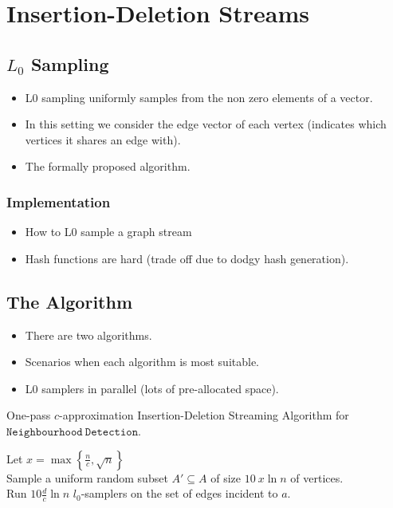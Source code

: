 \documentclass[11pt,twoside,a4paper]{report}
\begin{document}
\chapter{Insertion-Deletion Streams}

\section{$L_0$ Sampling}

\begin{itemize}
	\item L0 sampling uniformly samples from the non zero elements of a vector.
	\item In this setting we consider the edge vector of each vertex (indicates which vertices it shares an edge with).
	\item The formally proposed algorithm.
\end{itemize}

\subsection{Implementation}
\begin{itemize}
	\item How to L0 sample a graph stream
	\item Hash functions are hard (trade off due to dodgy hash generation).
\end{itemize}

\section{The Algorithm}

\begin{itemize}
	\item There are two algorithms.
	\item Scenarios when each algorithm is most suitable.
	\item L0 samplers in parallel (lots of pre-allocated space).
\end{itemize}

\begin{algorithm}[H]
	\caption{One-pass $c$-approximation Insertion-Deletion Streaming Algorithm for $\mathtt{Neighbourhood\ Detection}$. }
	Let $x=\max\left\{\frac{n}{c},\sqrt{n}\right\}$\\
	Sample a uniform random subset $A'\subseteq A$ of size $10\ x\ln n$ of vertices.\\
	 {
		Run $10\frac{d}{c}\ln n$ $l_0$-samplers on the set of edges incident to $a$.
	}
\end{algorithm}
\end{document}
